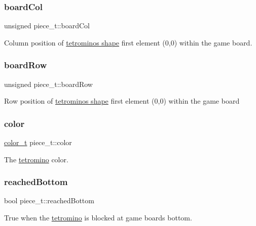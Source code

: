 \subsubsection{\texorpdfstring{board\+Col}{boardCol}}
{\footnotesize\ttfamily unsigned piece\+\_\+t\+::board\+Col}

Column position of \hyperlink{structpiece__t_a3c8f9c2e51c6bab728e564143c439746}{tetromino\textquotesingle{}s shape} first element (0,0) within the game board. \mbox{\label{structpiece__t_a14640fd68c44e80eacbe6adbf8597829}} 
\subsubsection{\texorpdfstring{board\+Row}{boardRow}}
{\footnotesize\ttfamily unsigned piece\+\_\+t\+::board\+Row}

Row position of \hyperlink{structpiece__t_a3c8f9c2e51c6bab728e564143c439746}{tetromino\textquotesingle{}s shape} first element (0,0) within the game board \mbox{\label{structpiece__t_af6408bda8899430d6457a83afb657225}} 
\subsubsection{\texorpdfstring{color}{color}}
{\footnotesize\ttfamily \hyperlink{TetreesDefs_8hpp_a8ba5fbce2446135735693ab60c896bbd}{color\+\_\+t} piece\+\_\+t\+::color}

The \hyperlink{TetreesDefs_8hpp_adf4f8e2cbbd7d8894fe3beda39db1b8f}{tetromino} color. \mbox{\label{structpiece__t_acb67c9322e157b7dd7c7e0efd212da76}} 
\subsubsection{\texorpdfstring{reached\+Bottom}{reachedBottom}}
{\footnotesize\ttfamily bool piece\+\_\+t\+::reached\+Bottom}

True when the \hyperlink{TetreesDefs_8hpp_adf4f8e2cbbd7d8894fe3beda39db1b8f}{tetromino} is blocked at game board\textquotesingle{}s bottom. \mbox{\label{structpiece__t_ab1d715c35231b557560096e2d79f4a43}} 
